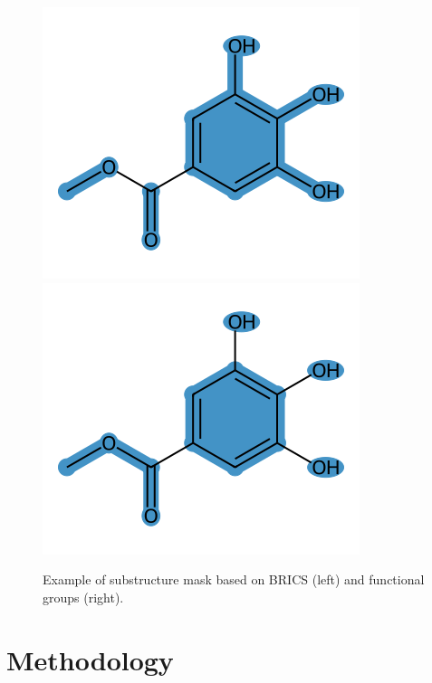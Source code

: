 \documentclass[twoside,twocolumn,9pt]{article}
\begin{document}
\begin{figure}[H]
    \centering
    \includegraphics[scale=0.35]{../data/images/example_brics.png}
    \includegraphics[scale=0.35]{../data/images/example_functional_groups.png}
    \caption{Example of substructure mask based on BRICS (left) and functional groups (right).}
\end{figure}


\section{Methodology}
\end{document}
